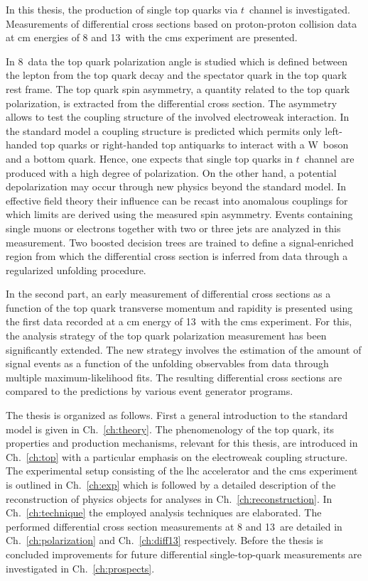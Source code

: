 In this thesis, the production of single top quarks via $t$~channel is investigated.  Measurements of differential cross sections based on proton-proton collision data at \acrlong{cm} energies of 8 and 13~\TeV with the \gls{cms} experiment are presented. 

In 8~\TeV data the top quark polarization angle is studied which is defined between the lepton from the top quark decay and the spectator quark in the top quark rest frame. The top quark spin asymmetry, a quantity related to the top quark polarization, is extracted from the differential cross section. The asymmetry allows to test the coupling structure of the involved electroweak interaction. In the standard model a  coupling structure is predicted which permits only left-handed top quarks or right-handed top antiquarks to interact with a W~boson and a bottom quark. Hence, one expects that single top quarks in $t$~channel are produced with a high degree of polarization. On the other hand, a potential depolarization may occur through new physics beyond the standard model. In effective field theory their influence can be recast into anomalous couplings for which limits are derived using the measured spin asymmetry. Events containing single muons or electrons together with two or three jets are analyzed in this measurement. Two boosted decision trees are trained to define a signal-enriched region from which the differential cross section is inferred from data through a regularized unfolding procedure.

In the second part, an early measurement of differential cross sections as a function of the top quark transverse momentum and rapidity is presented using the first data recorded at a \acrlong{cm} energy of 13~\TeV with the \gls{cms} experiment. For this, the analysis strategy of the top quark polarization measurement has been significantly extended. The new strategy involves the estimation of the amount of signal events as a function of the unfolding observables from data through multiple maximum-likelihood fits. The resulting differential cross sections are compared to the predictions by various event generator programs.

The thesis is organized as follows. First a general introduction to the standard model is given in Ch.~\ref{ch:theory}. The phenomenology of the top quark, its properties and production mechanisms, relevant for this thesis, are introduced in Ch.~\ref{ch:top} with a particular emphasis on the electroweak coupling structure. The experimental setup consisting of the \gls{lhc} accelerator and the \gls{cms} experiment is outlined in Ch.~\ref{ch:exp} which is followed by a detailed description of the reconstruction of physics objects for analyses in Ch.~\ref{ch:reconstruction}. In Ch.~\ref{ch:technique} the employed analysis techniques are elaborated. The performed differential cross section measurements at 8 and 13~\TeV are detailed in Ch.~\ref{ch:polarization} and Ch.~\ref{ch:diff13} respectively. Before the thesis is concluded improvements for future differential single-top-quark measurements are investigated in Ch.~\ref{ch:prospects}.


